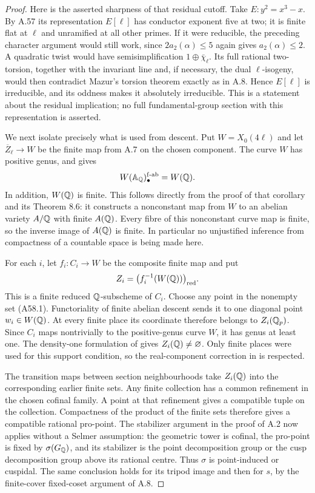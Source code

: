 \begin{proof}
Here is the asserted sharpness of that residual cutoff. Take
$E:y^2=x^3-x$. By A.57 its representation $E[\ell]$ has conductor
exponent five at two; it is finite flat at $\ell$ and unramified at
all other primes. If it were reducible, the preceding character
argument would still work, since $2a_2(\alpha)\le5$ again gives
$a_2(\alpha)\le2$. A quadratic twist would have semisimplification
$1\oplus\bar\chi_\ell$. Its full rational two-torsion, together
with the invariant line and, if necessary, the dual $\ell$-isogeny,
would then contradict Mazur's torsion theorem exactly as in A.8.
Hence $E[\ell]$ is irreducible, and its oddness makes it absolutely
irreducible. This is a statement about the residual implication;
no full fundamental-group section with this representation is asserted.

We next isolate precisely what is used from descent. Put
$W=X_0(4\ell)$ and let $\overline Z_\ell\to W$ be the finite map
from A.7 on the chosen component. The curve $W$ has positive genus,
and \citet[Corollary 8.8]{AMStoll2007} gives
\[
 W(\mathbb A_\mathbb Q)_\bullet^{\mathrm{f\text{-}ab}}=W(\mathbb Q).
\]
In addition, $W(\mathbb Q)$ is finite. This follows directly from the
proof of that corollary and its Theorem 8.6: it constructs a nonconstant
map from $W$ to an abelian variety $A/\mathbb Q$ with finite $A(\mathbb Q)$.
Every fibre of this nonconstant curve map is finite, so the inverse
image of $A(\mathbb Q)$ is finite. In particular no unjustified inference
from compactness of a countable space is being made here.

For each $i$, let $f_i:C_i\to W$ be the composite finite map and put
\[
 Z_i=\bigl(f_i^{-1}(W(\mathbb Q))\bigr)_{\mathrm{red}}.
\]
This is a finite reduced $\mathbb Q$-subscheme of $C_i$.
Choose any point in the nonempty set (A58.1). Functoriality of finite
abelian descent sends it to one diagonal point $w_i\in W(\mathbb Q)$.
At every finite place its coordinate therefore belongs to
$Z_i(\mathbb Q_p)$. Since $C_i$ maps nontrivially to the positive-genus curve
$W$, it has genus at least one. The density-one formulation of
\citet[Theorem 8.2]{AMStoll2007} gives $Z_i(\mathbb Q)\ne\varnothing$.
Only finite places were used for this support condition, so the
real-component correction in \citet[\S3]{AMStollErrata2017} is respected.

The transition maps between section neighbourhoods take $Z_i(\mathbb Q)$
into the corresponding earlier finite sets. Any finite collection
has a common refinement in the chosen cofinal family. A point at
that refinement gives a compatible tuple on the collection. Compactness
of the product of the finite sets therefore gives a compatible
rational pro-point. The stabilizer argument in the proof of A.2 now
applies without a Selmer assumption: the geometric tower is cofinal,
the pro-point is fixed by $\sigma(G_\mathbb Q)$, and its stabilizer is the
point decomposition group or the cusp decomposition group above its
rational centre. Thus $\sigma$ is point-induced or cuspidal.
The same conclusion holds for its tripod image and then for $s$,
by the finite-cover fixed-coset argument of A.8.


\end{proof}
